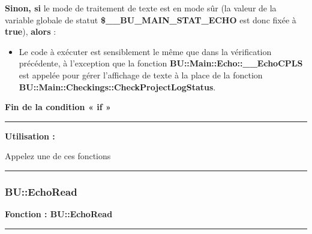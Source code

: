 \documentclass[a4paper,10pt]{article}
\begin{document}
\setlength{\parskip}{1em}

\begin{justify}
    \textbf{\color{cond}Sinon, si} le mode de traitement de texte est en mode sûr (la valeur de la variable globale de statut \textbf{\color{vars}\$\_\_BU\_MAIN\_STAT\_ECHO} est donc fixée à \textbf{true}), \textbf{\color{cond}alors} :

    \begin{itemize}
        \item
        {
            \begin{justify}
                Le code à exécuter est sensiblement le même que dans la vérification précédente, à l'exception que la fonction \textbf{\color{func}BU::Main::Echo::\_\_EchoCPLS} est appelée pour gérer l'affichage de texte à la place de la fonction \textbf{\color{func}BU::Main::Checkings::CheckProjectLogStatus}.
            \end{justify}
        }
    \end{itemize}
\end{justify}

\begin{justify}
    \textbf{\color{cond}Fin de la condition « if »}
\end{justify}


\par\noindent\rule{\textwidth}{0.4pt}

\begin{justify}
    \textbf{Utilisation :}

    Appelez une de ces fonctions
\end{justify}



\color{sec3}\par\noindent\rule{\textwidth}{0.4pt}\color{text}

\color{sec3}
\subsubsection{BU::EchoRead}\color{text}

\begin{justify}
    \textbf{Fonction : \color{func}BU::EchoRead}
\end{justify}


\par\noindent\rule{\textwidth}{0.4pt}
\end{document}
